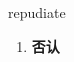 
\begin{frame}
{\huge repudiate}
\begin{center}
\begin{enumerate}\Large
  \item \textbf{否认}
\end{enumerate}
\end{center}
\end{frame}
